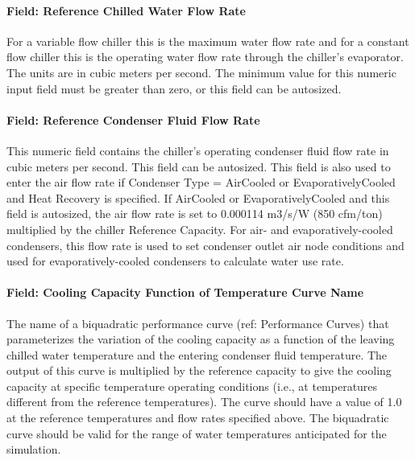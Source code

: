 \paragraph{Field: Reference Chilled Water Flow Rate}\label{field-reference-chilled-water-flow-rate}

For a variable flow chiller this is the maximum water flow rate and for a constant flow chiller this is the operating water flow rate through the chiller's evaporator. The units are in cubic meters per second. The minimum value for this numeric input field must be greater than zero, or this field can be autosized.

\paragraph{Field: Reference Condenser Fluid Flow Rate}\label{field-reference-condenser-fluid-flow-rate}

This numeric field contains the chiller's operating condenser fluid flow rate in cubic meters per second. This field can be autosized. This field is also used to enter the air flow rate if Condenser Type = AirCooled or EvaporativelyCooled and Heat Recovery is specified. If AirCooled or EvaporativelyCooled and this field is autosized, the air flow rate is set to 0.000114 m3/s/W (850 cfm/ton) multiplied by the chiller Reference Capacity. For air- and evaporatively-cooled condensers, this flow rate is used to set condenser outlet air node conditions and used for evaporatively-cooled condensers to calculate water use rate.

\paragraph{Field: Cooling Capacity Function of Temperature Curve Name}\label{field-cooling-capacity-function-of-temperature-curve-name}

The name of a biquadratic performance curve (ref: Performance Curves) that parameterizes the variation of the cooling capacity as a function of the leaving chilled water temperature and the entering condenser fluid temperature. The output of this curve is multiplied by the reference capacity to give the cooling capacity at specific temperature operating conditions (i.e., at temperatures different from the reference temperatures). The curve should have a value of 1.0 at the reference temperatures and flow rates specified above. The biquadratic curve should be valid for the range of water temperatures anticipated for the simulation.

